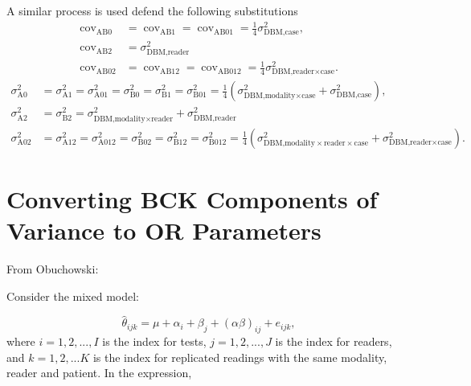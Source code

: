 \documentclass{article}%
\begin{document}
A similar process is used defend the following substitutions%
\begin{align}
\operatorname{cov}_{\text{AB}0}  &  =\operatorname{cov}_{\text{AB}%
1}=\operatorname{cov}_{\text{AB}01}=\frac{1}{4}\sigma_{\text{DBM,case}}^{2},\\
\operatorname{cov}_{\text{AB}2}  &  =\sigma_{\text{DBM,reader}}^{2}\\
\operatorname{cov}_{\text{AB}02}  &  =\operatorname{cov}_{\text{AB}%
12}=\operatorname{cov}_{\text{AB}012}=\frac{1}{4}\sigma_{\text{DBM,reader}%
\times\text{case}}^{2}.
\end{align}%
\begin{align}
\sigma_{\text{A}0}^{2}  &  =\sigma_{\text{A}1}^{2}=\sigma_{\text{A}01}%
^{2}=\sigma_{\text{B}0}^{2}=\sigma_{\text{B}1}^{2}=\sigma_{\text{B}01}%
^{2}=\frac{1}{4}\left(  \sigma_{\text{DBM,modality}\times\text{case}}%
^{2}+\sigma_{\text{DBM,case}}^{2}\right)  ,\\
\sigma_{\text{A}2}^{2}  &  =\sigma_{\text{B}2}^{2}=\sigma_{\text{DBM,modality}%
\times\text{reader}}^{2}+\sigma_{\text{DBM,reader}}^{2}\\
\sigma_{\text{A}02}^{2}  &  =\sigma_{\text{A}12}^{2}=\sigma_{\text{A}012}%
^{2}=\sigma_{\text{B}02}^{2}=\sigma_{\text{B}12}^{2}=\sigma_{\text{B}012}%
^{2}=\frac{1}{4}\left(  \sigma_{\text{DBM,modality}\times\text{reader}%
\times\text{case}}^{2}+\sigma_{\text{DBM,reader}\times\text{case}}^{2}\right)
.
\end{align}


\section{Converting BCK Components of Variance to OR Parameters}

From Obuchowski:

Consider the mixed model:%

\begin{equation}
\widehat{\theta}_{ijk}=\mu+\alpha_{i}+\beta_{j}+\left(  \alpha\beta\right)
_{ij}+e_{ijk},
\end{equation}
where $i=1,2,...,I$ is the index for tests, $j=1,2,...,J$ is the index for
readers, and $k=1,2,...K$ is the index for replicated readings with the same
modality, reader and patient. In the expression,
\end{document}
